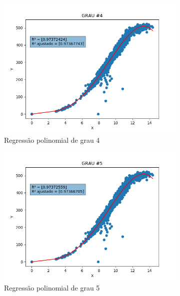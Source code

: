 \documentclass[paper=a4, fontsize=11pt]{scrartcl}
\numberwithin{equation}{section}		%
\numberwithin{figure}{section}			%
\numberwithin{table}{section}				%
\begin{document}
\begin{figure}[h!]
\begin{subfigure}{.5\textwidth}
		\end{subfigure}
		\begin{subfigure}{.5\textwidth}
			\centering
			\includegraphics[width=\linewidth]{img/q1_fig_GRAU4.png}
			\caption{Regressão polinomial de grau 4}
			\label{fig:q1grau4}
		\end{subfigure}%
		\begin{subfigure}{.5\textwidth}
			\centering
			\includegraphics[width=\linewidth]{img/q1_fig_GRAU5.png}
			\caption{Regressão polinomial de grau 5}
			\label{fig:q1_grau5}
		\end{subfigure}
		\begin{subfigure}{.5\textwidth}
			\centering

\end{subfigure}
\end{figure}
\end{document}
